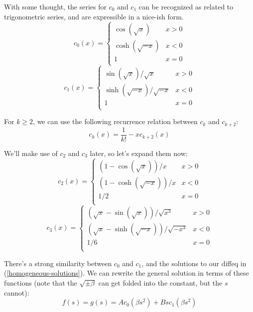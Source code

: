 \documentclass{article}
\numberwithin{equation}{subsection}
\begin{document}
With some thought, the series for $c_0$ and $c_1$ can be recognized as related to trigonometric series, and are expressible in a nice-ish form.
\begin{equation}
c_0(x) = \begin{cases}
\cos(\sqrt x)    & x > 0 \\
\cosh(\sqrt{-x}) & x < 0 \\
1                & x = 0 \\
\end{cases}
\end{equation}
\begin{equation}
c_1(x) = \begin{cases}
\sin(\sqrt x) / \sqrt x      & x > 0 \\
\sinh(\sqrt{-x}) / \sqrt{-x} & x < 0 \\
1                            & x = 0 \\
\end{cases}
\end{equation}

For $k \ge 2$, we can use the following recurrence relation between $c_k$ and $c_{k+2}$:
\begin{equation}
c_k(x) = \frac{1}{k!} - x c_{k+2}(x)
\end{equation}

We'll make use of $c_2$ and $c_3$ later, so let's expand them now:
\begin{equation}
c_2(x) = \begin{cases}
(1 - \cos(\sqrt x)) / x    & x > 0 \\
(1 - \cosh(\sqrt{-x})) / x & x < 0 \\
1/2                        & x = 0 \\
\end{cases}
\end{equation}
\begin{equation}
c_3(x) = \begin{cases}
(\sqrt x - \sin(\sqrt x)) / \sqrt{x^3}      & x > 0 \\
(\sqrt x - \sinh(\sqrt{-x})) / \sqrt{-x^3}  & x < 0 \\
1/6                                         & x = 0 \\
\end{cases}
\end{equation}

There's a strong similarity between $c_0$ and $c_1$, and the solutions to our diffeq in (\ref{homogeneous-solutions}). We can rewrite the general solution in terms of these functions (note that the $\sqrt{\pm \beta}$ can get folded into the constant, but the $s$ cannot):
\begin{equation}
f(s) = g(s) = A c_0(\beta s^2) + B s c_1(\beta s^2)
\end{equation}
\end{document}
